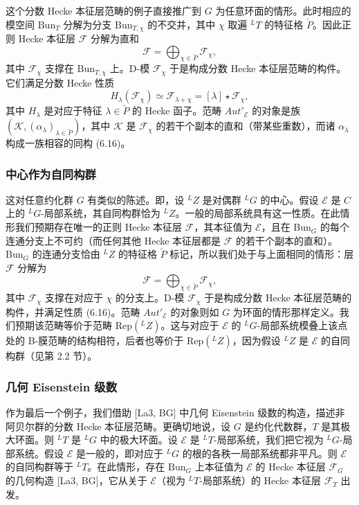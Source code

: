 \documentclass[11pt,a4paper]{article}
\newcommand{\Bun}{\mathrm{Bun}}
\begin{document}
这个分数 Hecke 本征层范畴的例子直接推广到 $G$ 为任意环面的情形。此时相应的模空间 $\Bun_T$ 分解为分支 $\Bun_{T,\chi}$ 的不交并，其中 $\chi$ 取遍 ${}^LT$ 的特征格 $\check{P}$。因此正则 Hecke 本征层 $\mathcal{F}$ 分解为直和
\begin{equation}\tag{6.15}
\mathcal{F} = \bigoplus_{\chi\in\check{P}}\mathcal{F}_\chi,
\end{equation}
其中 $\mathcal{F}_\chi$ 支撑在 $\Bun_{T,\chi}$ 上。D-模 $\mathcal{F}_\chi$ 于是构成分数 Hecke 本征层范畴的构件。它们满足分数 Hecke 性质
\begin{equation}\tag{6.16}
H_\lambda(\mathcal{F}_\chi)\simeq\mathcal{F}_{\lambda+\chi} = [\lambda]\star\mathcal{F}_\chi,
\end{equation}
其中 $H_\lambda$ 是对应于特征 $\lambda\in\check{P}$ 的 Hecke 函子。范畴 $Aut'_{\mathcal{E}}$ 的对象是族 $(\mathcal{K},(\alpha_\lambda)_{\lambda\in\check{P}})$，其中 $\mathcal{K}$ 是 $\mathcal{F}_\chi$ 的若干个副本的直和（带某些重数），而诸 $\alpha_\lambda$ 构成一族相容的同构 (6.16)。

\subsubsection{中心作为自同构群}

这对任意约化群 $G$ 有类似的陈述。即，设 ${}^LZ$ 是对偶群 ${}^LG$ 的中心。假设 $\mathcal{E}$ 是 $C$ 上的 ${}^LG$-局部系统，其自同构群恰为 ${}^LZ$。一般的局部系统具有这一性质。在此情形我们预期存在唯一的正则 Hecke 本征层 $\mathcal{F}$，其本征值为 $\mathcal{E}$，且在 $\Bun_G$ 的每个连通分支上不可约（而任何其他 Hecke 本征层都是 $\mathcal{F}$ 的若干个副本的直和）。$\Bun_G$ 的连通分支恰由 ${}^LZ$ 的特征格 $\check{P}$ 标记，所以我们处于与上面相同的情形：层 $\mathcal{F}$ 分解为
\[
\mathcal{F} = \bigoplus_{\chi\in\check{P}}\mathcal{F}_\chi,
\]
其中 $\mathcal{F}_\chi$ 支撑在对应于 $\chi$ 的分支上。D-模 $\mathcal{F}_\chi$ 于是构成分数 Hecke 本征层范畴的构件，并满足性质 (6.16)。范畴 $Aut'_{\mathcal{E}}$ 的对象则如 $G$ 为环面的情形那样定义。我们预期该范畴等价于范畴 $\mathrm{Rep}({}^LZ)$。这与对应于 $\mathcal{E}$ 的 ${}^LG$-局部系统模叠上该点处的 B-膜范畴的结构相符，后者也等价于 $\mathrm{Rep}({}^LZ)$，因为假设 ${}^LZ$ 是 $\mathcal{E}$ 的自同构群（见第 2.2 节）。

\subsubsection{几何 Eisenstein 级数}

作为最后一个例子，我们借助 [La3, BG] 中几何 Eisenstein 级数的构造，描述非阿贝尔群的分数 Hecke 本征层范畴。更确切地说，设 $G$ 是约化代数群，$T$ 是其极大环面。则 ${}^LT$ 是 ${}^LG$ 中的极大环面。设 $\mathcal{E}$ 是 ${}^LT$-局部系统，我们把它视为 ${}^LG$-局部系统。假设 $\mathcal{E}$ 是一般的，即对应于 ${}^LG$ 的根的各秩一局部系统都非平凡。则 $\mathcal{E}$ 的自同构群等于 ${}^LT$。在此情形，存在 $\Bun_G$ 上本征值为 $\mathcal{E}$ 的 Hecke 本征层 $\mathcal{F}_G$ 的几何构造 [La3, BG]，它从关于 $\mathcal{E}$（视为 ${}^LT$-局部系统）的 Hecke 本征层 $\mathcal{F}_T$ 出发。
\end{document}
